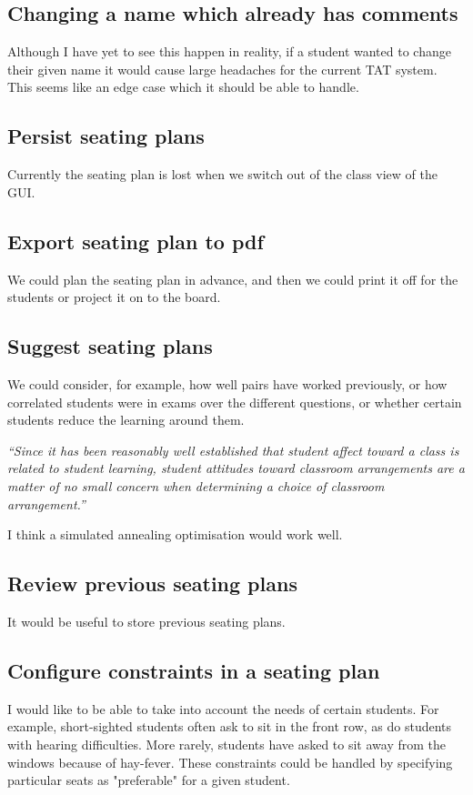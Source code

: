 \documentclass[10pt]{article}
\begin{document}
\subsection{Changing a name which already has comments}
Although I have yet to see this happen in reality, if a student wanted to change their given name it would cause large headaches for the current TAT system. This seems like an edge case which it should be able to handle.

\subsection{Persist seating plans}
Currently the seating plan is lost when we switch out of the class view of the GUI.

\subsection{Export seating plan to pdf}
We could plan the seating plan in advance, and then we could print it off for the students or project it on to the board.

\subsection{Suggest seating plans}
We could consider, for example, how well pairs have worked previously, or how correlated students were in exams over the different questions, or whether certain students reduce the learning around them.
\begin{center} 
\emph{``Since it has been reasonably well established that student affect toward a class is related to student learning, student attitudes toward classroom arrangements are a matter of no small concern when determining a choice of classroom arrangement.''} \cite{MM78}
\end{center}
I think a simulated annealing optimisation would work well.

\subsection{Review previous seating plans}
It would be useful to store previous seating plans.

\subsection{Configure constraints in a seating plan}
I would like to be able to take into account the needs of certain students. For example, short-sighted students often ask to sit in the front row, as do students with hearing difficulties. More rarely, students have asked to sit away from the windows because of hay-fever. These constraints could be handled by specifying particular seats as "preferable" for a given student.
\end{document}
